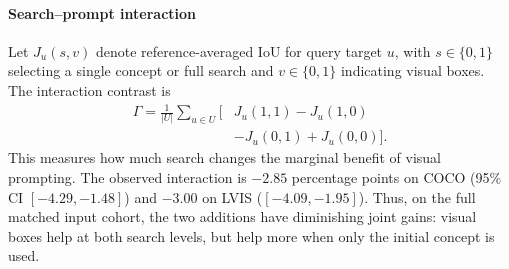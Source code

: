 \paragraph{Search--prompt interaction}
Let $J_u(s,v)$ denote reference-averaged IoU for query target $u$, with
$s\in\{0,1\}$ selecting a single concept or full search and
$v\in\{0,1\}$ indicating visual boxes. The interaction contrast is
\begin{equation}
  \begin{aligned}
  \Gamma=\frac{1}{|U|}\sum_{u\in U}\bigl[&J_u(1,1)-J_u(1,0)\\
                              &-J_u(0,1)+J_u(0,0)\bigr].
  \end{aligned}
  \label{eq:search-visual-interaction}
\end{equation}
This measures how much search changes the marginal benefit of visual
prompting. The observed interaction is $-2.85$ percentage points on COCO
(95\% CI $[-4.29,-1.48]$) and $-3.00$ on LVIS
($[-4.09,-1.95]$). Thus, on the full matched input cohort, the two additions
have diminishing joint gains: visual boxes help at both search levels,
but help more when only the initial concept is used.

